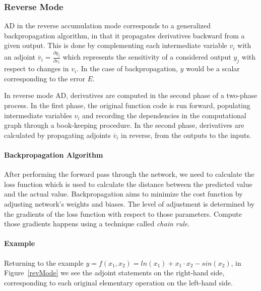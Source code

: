 \subsubsection{Reverse Mode}
AD in the reverse accumulation mode corresponds to a generalized backpropagation algorithm, in that it propagates derivatives backward from a given output. This is done by complementing each intermediate variable $v_i$ with an adjoint $\overline{v}_i=\frac{\partial y_j}{\partial v_i}$ which represents the sensitivity of a considered output $y_j$ with respect to changes in $v_i$. In the case of backpropagation, $y$ would be a scalar corresponding to the error $E$.

In reverse mode AD, derivatives are computed in the second phase of a two-phase process. In the first phase, the original function code is run forward, populating intermediate variables $v_i$ and recording the dependencies in the computational graph through a book-keeping procedure. In the second phase, derivatives are calculated by propagating adjoints
$\overline{v}_i$ in reverse, from the outputs to the inputs.

\paragraph{Backpropagation Algorithm}
After performing the forward pass through the network, we need to calculate the loss function which is used to calculate the distance between the predicted value and the actual value. Backpropagation aims to minimize the cost function by adjusting network’s weights and biases. The level of adjustment is determined by the gradients of the loss function with respect to those parameters. Compute those gradients happens using a technique called \emph{chain rule}.

\paragraph{Example}
Returning to the example $y=f(x_1,x_2)= ln(x_1)+ x_1 \cdot x_2 -sin(x_2)$, in Figure~\ref{revMode}  we see the adjoint statements on the right-hand side, corresponding to each original elementary operation on the left-hand side.

